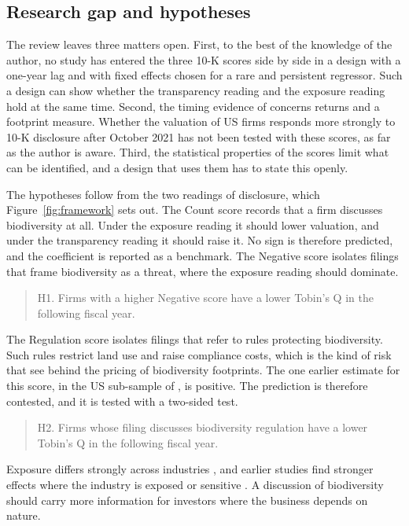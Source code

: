 \documentclass[12pt,a4paper]{article}
\begin{document}
\subsection{Research gap and hypotheses}

The review leaves three matters open. First, to the best of the knowledge of the author, no study has entered the three 10-K scores side by side in a design with a one-year lag and with fixed effects chosen for a rare and persistent regressor. Such a design can show whether the transparency reading and the exposure reading hold at the same time. Second, the timing evidence of \citet{garel2024} concerns returns and a footprint measure. Whether the valuation of US firms responds more strongly to 10-K disclosure after October 2021 has not been tested with these scores, as far as the author is aware. Third, the statistical properties of the scores limit what can be identified, and a design that uses them has to state this openly.

The hypotheses follow from the two readings of disclosure, which Figure~\ref{fig:framework} sets out. The Count score records that a firm discusses biodiversity at all. Under the exposure reading it should lower valuation, and under the transparency reading it should raise it. No sign is therefore predicted, and the coefficient is reported as a benchmark. The Negative score isolates filings that frame biodiversity as a threat, where the exposure reading should dominate.

\begin{quote}
H1. Firms with a higher Negative score have a lower Tobin's Q in the following fiscal year.
\end{quote}

The Regulation score isolates filings that refer to rules protecting biodiversity. Such rules restrict land use and raise compliance costs, which is the kind of risk that \citet{garel2024} see behind the pricing of biodiversity footprints. The one earlier estimate for this score, in the US sub-sample of \citet{cosma2025}, is positive. The prediction is therefore contested, and it is tested with a two-sided test.

\begin{quote}
H2. Firms whose filing discusses biodiversity regulation have a lower Tobin's Q in the following fiscal year.
\end{quote}

Exposure differs strongly across industries \citep{giglio2026}, and earlier studies find stronger effects where the industry is exposed or sensitive \citep{ahmad2024,bach2025}. A discussion of biodiversity should carry more information for investors where the business depends on nature.
\end{document}
